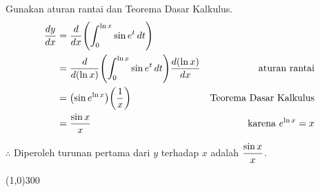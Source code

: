 \begin{enumerate}[leftmargin=*, label={\arabic*}.]
Gunakan aturan rantai dan Teorema Dasar Kalkulus.
\begin{align*}
    \frac{dy}{dx} &= \drv{x}{\int_{0}^{\ln x}\sin e^{t}\,dt}\\
    &= \drv{(\ln x)}{\int_{0}^{\ln x}\sin e^{t}\,dt}\frac{d(\ln x)}{dx}
    &\text{aturan rantai}\\
    &=\brk*{\sin e^{\ln x}}\brk*{\frac{1}{x}}
    &\text{Teorema Dasar Kalkulus}\\
    &=\frac{\sin x}{x}
    &\text{karena }e^{\ln x} = x
\end{align*}

$\therefore$ Diperoleh turunan pertama dari $y$ terhadap $x$ adalah $\displaystyle\frac{\sin x}{x}$.

\end{enumerate}
\begin{center}
    \line(1,0){300}
\end{center}